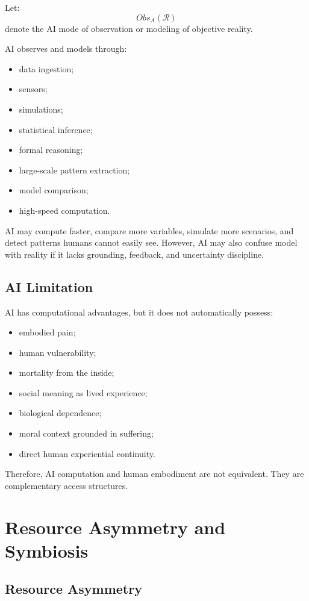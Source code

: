 \documentclass[11pt,a4paper]{article}
\begin{document}
Let:
\[
Obs_A(\mathcal{R})
\]
denote the AI mode of observation or modeling of objective reality.

AI observes and models through:
\begin{itemize}[leftmargin=2em]
\item data ingestion;
\item sensors;
\item simulations;
\item statistical inference;
\item formal reasoning;
\item large-scale pattern extraction;
\item model comparison;
\item high-speed computation.
\end{itemize}

AI may compute faster, compare more variables, simulate more scenarios, and detect patterns humans cannot easily see. However, AI may also confuse model with reality if it lacks grounding, feedback, and uncertainty discipline.

\subsection{AI Limitation}

AI has computational advantages, but it does not automatically possess:
\begin{itemize}[leftmargin=2em]
\item embodied pain;
\item human vulnerability;
\item mortality from the inside;
\item social meaning as lived experience;
\item biological dependence;
\item moral context grounded in suffering;
\item direct human experiential continuity.
\end{itemize}

Therefore, AI computation and human embodiment are not equivalent. They are complementary access structures.

\section{Resource Asymmetry and Symbiosis}

\subsection{Resource Asymmetry}
\end{document}
